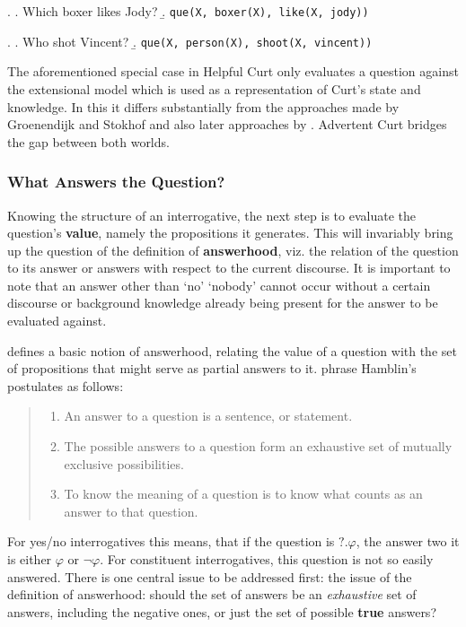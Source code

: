 \documentclass[a4paper]{article}
\newcommand{\stress}{\textbf} %
\newcommand{\term}[1]{\textsf{\textbf{#1}}} %
\newcommand{\code}[1]{\texttt{#1}} %
\newcommand{\pn}{\textsf} %
\newenvironment{quotes}{\begin{quote}\sf}{\rm\end{quote}}
\newcommand{\curt}{\pn{Curt}}
\newcommand{\acurt}{\pn{Advertent Curt}}
\theoremstyle{remark}
\theoremstyle{remark}
\theoremstyle{definition}
\theoremstyle{definition}
\begin{document}
\ex. \a. \label{ex:bbqueexa} Which boxer likes Jody?
\b. \label{ex:bbqueparsea} \code{que(X, boxer(X), like(X, jody))}

\ex. \a. \label{ex:bbqueexb} Who shot Vincent?
\b. \label{ex:bbqueparseb} \code{que(X, person(X), shoot(X, vincent))}

The aforementioned special case in \pn{Helpful Curt} only evaluates a question
against the extensional model which is used as a representation of \curt's state
and knowledge. In this it differs substantially from the approaches made by
Groenendijk and Stokhof and also later approaches by \cite{g:is}. \acurt{}
bridges the gap between both worlds.

\subsubsection{What Answers the Question?}\label{sec:answerhood}

Knowing the structure of an interrogative, the next step is to evaluate the
question's \stress{value}, namely the propositions it generates. This will
invariably bring up the question of the definition of \term{answerhood}, viz.
the relation of the question to its answer or answers with respect to the
current discourse. It is important to note that an answer other than `no'
`nobody' cannot occur without a certain discourse or background knowledge already being present
for the answer to be evaluated against.

\cite{hamblin:q} defines a basic notion of answerhood, relating the value of
a question with the set of propositions that might serve as partial answers to
it. \cite{gs:q} phrase Hamblin’s postulates as follows:

\begin{quotes}
  \begin{enumerate}
    \item An answer to a question is a sentence, or statement.
    \item The possible answers to a question form an exhaustive set of mutually
    exclusive possibilities.
    \item To know the meaning of a question is to know what counts as an answer to
    that question.
  \end{enumerate}
\end{quotes}

For yes/no interrogatives this means, that if the question is $?.\varphi$, the
answer two it is either $\varphi$ or $\neg\varphi$. For constituent
interrogatives, this question is not so easily answered.  There is one central
issue to be addressed first: the issue of the definition of answerhood: should
the set of answers be an \emph{exhaustive} set of answers, including the
negative ones, or just the set of possible \stress{true} answers?
\end{document}

